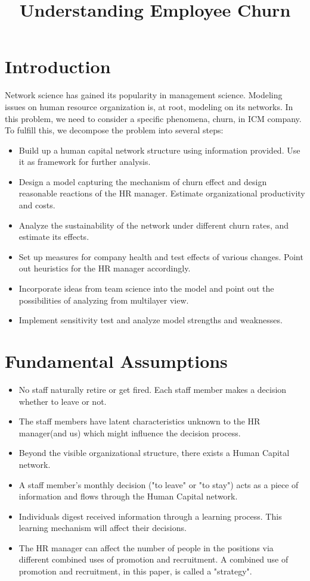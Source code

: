 \documentclass[tcn = 37075, sheet = false, abstract = false]{mcmthesis}
\title{Understanding Employee Churn}
\author{}
\date{}
\begin{document}
\maketitle


\setcounter{tocdepth}{2}
\tableofcontents

\section{Introduction}

Network science has gained its popularity in management science. Modeling issues on human resource organization is, at root, modeling on its networks. In this problem, we need to consider a specific phenomena, churn, in  ICM company. To fulfill this, we decompose the problem into several steps:

\begin{itemize}
\item Build up a human capital network structure using information provided. Use it as framework for further analysis.
\item Design a model capturing the mechanism of churn effect and design reasonable reactions of the HR manager. Estimate organizational productivity and costs.
\item Analyze the sustainability of the network under different churn rates, and estimate its effects.
\item Set up measures for company health and test effects of various changes. Point out heuristics for the HR manager accordingly.
\item Incorporate ideas from team science into the model and point out the possibilities of analyzing from multilayer view.
\item Implement sensitivity test and analyze model strengths and weaknesses.
\end{itemize}

\section{Fundamental Assumptions}

\begin{itemize}
\item No staff naturally retire or get fired. Each staff member makes a decision whether to leave or not.
\item The staff members have latent characteristics unknown to the HR manager(and us) which might influence the decision process.
\item Beyond the visible organizational structure, there exists a Human Capital network.
\item A staff member's monthly decision ("to leave" or "to stay") acts as a piece of information and flows through the Human Capital network.
\item Individuals digest received information through a learning process. This learning mechanism will affect their decisions.
\item The HR manager can affect the number of people in the positions via different combined uses of promotion and recruitment. A combined use of promotion and recruitment, in this paper, is called a "strategy".
\end{itemize}
\end{document}
